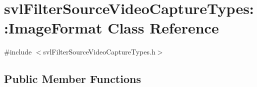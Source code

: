 \hypertarget{classsvl_filter_source_video_capture_types_1_1_image_format}{}\section{svl\+Filter\+Source\+Video\+Capture\+Types\+:\+:Image\+Format Class Reference}
\label{classsvl_filter_source_video_capture_types_1_1_image_format}


{\ttfamily \#include $<$svl\+Filter\+Source\+Video\+Capture\+Types.\+h$>$}

\subsection*{Public Member Functions}
